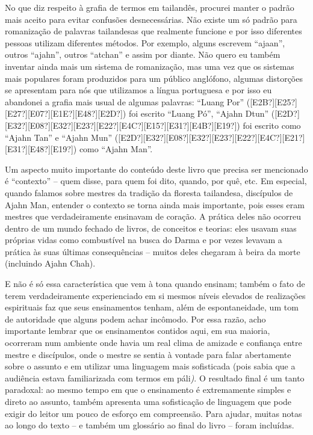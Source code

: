 No que diz respeito à grafia de termos em tailandês, procurei manter
o padrão mais aceito para evitar confusões desnecessárias. Não existe
um só padrão para romanização de palavras tailandesas que realmente
funcione e por isso diferentes pessoas utilizam diferentes métodos. Por
exemplo, alguns escrevem “ajaan”, outros “ajahn”, outros “atchan” e
assim por diante. Não quero eu também inventar ainda mais um sistema de
romanização, mas uma vez que os sistemas mais populares foram
produzidos para um público anglófono, algumas distorções se apresentam
para nós que utilizamos a língua portuguesa e por isso eu abandonei a
grafia mais usual de algumas palavras: “Luang Por”
([E2B?][E25?][E27?][E07?][E1E?][E48?][E2D?]) foi escrito “Luang Pó”,
“Ajahn Dtun”
([E2D?][E32?][E08?][E32?][E23?][E22?][E4C?][E15?][E31?][E4B?][E19?])
foi escrito como “Ajahn Tan” e “Ajahn Mun”
([E2D?][E32?][E08?][E32?][E23?][E22?][E4C?][E21?][E31?][E48?][E19?])
como “Ajahn Man”. 

Um aspecto muito importante do conteúdo deste livro que precisa ser
mencionado é “contexto” – quem disse, para quem foi dito, quando, por
quê, etc. Em especial, quando falamos sobre mestres da tradição da
floresta tailandesa, discípulos de Ajahn Man, entender o contexto se
torna ainda mais importante, pois esses eram mestres que
verdadeiramente ensinavam de coração. A prática deles não ocorreu
dentro de um mundo fechado de livros, de conceitos e teorias: eles
usavam suas próprias vidas como combustível na busca do Darma e por
vezes levavam a prática às suas últimas consequências – muitos deles
chegaram à beira da morte (incluindo Ajahn Chah). 

E não é só essa característica que vem à tona quando ensinam; também
o fato de terem verdadeiramente experienciado em si mesmos níveis
elevados de realizações espirituais faz que seus ensinamentos tenham,
além de espontaneidade, um tom de autoridade que alguns podem achar
incômodo. Por essa razão, acho importante lembrar que os ensinamentos
contidos aqui, em sua maioria, ocorreram num ambiente onde havia um
real clima de amizade e confiança entre mestre e discípulos, onde o
mestre se sentia à vontade para falar abertamente sobre o assunto e em
utilizar uma linguagem mais sofisticada (pois sabia que a audiência
estava familiarizada com termos em páli\textit{)}. O resultado final é
um tanto paradoxal: ao mesmo tempo em que o ensinamento é extremamente
simples e direto ao assunto, também apresenta uma sofisticação de
linguagem que pode exigir do leitor um pouco de esforço em compreensão.
Para ajudar, muitas notas ao longo do texto – e também um glossário ao
final do livro – foram incluídas.

